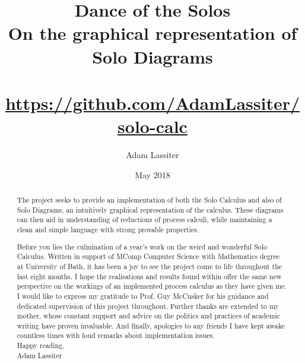 \documentclass{article}
\title{Dance of the Solos \\
    \large On the graphical representation of Solo Diagrams \\~\\
    \small \url{https://github.com/AdamLassiter/solo-calc}}
\author{Adam Lassiter}
\date{May 2018}
\begin{document}
    
    \maketitle
    \vspace{\fill}
    \begin{abstract}
        The project seeks to provide an implementation of both the Solo Calculus and also of Solo Diagrams, an intuitively graphical representation of the calculus.
        These diagrams can then aid in understanding of reductions of process calculi, while maintaining a clean and simple language with strong provable properties.
    \end{abstract}
    \vspace{\fill}
    \begin{figure}[H]
        \centering
        \def\svgwidth{\columnwidth/3}
        
    \end{figure}
    \vspace{\fill}
    \pagebreak
    
    \renewcommand{\abstractname}{Preface}
    \null\vspace{\fill}
    \begin{abstract}
        Before you lies the culmination of a year's work on the weird and wonderful Solo Calculus.
        Written in support of MComp Computer Science with Mathematics degree at University of Bath, it has been a joy to see the project come to life throughout the last eight months.
        I hope the realisations and results found within offer the same new perspective on the workings of an implemented process calculus as they have given me.\\

        I would like to express my gratitude to Prof. Guy McCusker for his guidance and dedicated supervision of this project throughout.
        Further thanks are extended to my mother, whose constant support and advice on the politics and practices of academic writing have proven invaluable.
        And finally, apologies to any friends I have kept awake countless times with loud remarks about implementation issues.\\

        Happy reading,\\

        Adam Lassiter
    \end{abstract}
    \vspace{\fill}
    \pagebreak
    
\end{document}
